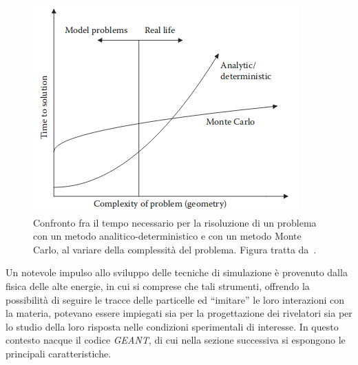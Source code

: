 \begin{figure} [!t]
	\centering
	\includegraphics[scale=0.75]{Grafici/monte_carlo_vs_analytic2.png}
	\caption{Confronto fra il tempo necessario per la risoluzione di un problema con un metodo analitico-deterministico e con un metodo Monte Carlo, al variare della complessità del problema. Figura tratta da~\cite{bielajew:13}.} \label{fig:monte_carlo}
\end{figure}




%
%
Un notevole impulso allo sviluppo delle tecniche di simulazione è provenuto dalla fisica delle alte energie, in cui si comprese che tali strumenti, offrendo la possibilità di seguire le tracce delle particelle ed ``imitare'' le loro interazioni con la materia, potevano essere impiegati sia per la progettazione dei rivelatori sia per lo studio della loro risposta nelle condizioni sperimentali di interesse.
In questo contesto nacque il codice \emph{GEANT}, di cui nella sezione successiva si espongono le principali caratteristiche.





